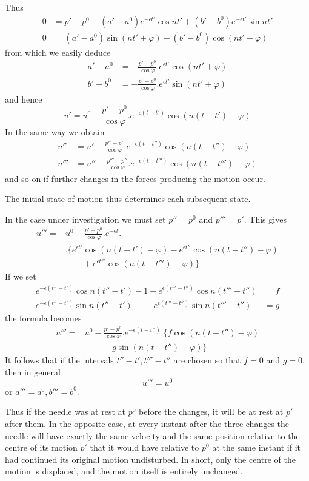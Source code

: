 Thus
\[
\begin{aligned}
0&=p'-p^0+(a'-a^0)e^{-\epsilon t'}\cos nt'+(b'-b^0)e^{-\epsilon t'}\sin nt'\\
0&=(a'-a^0)\sin(nt'+\varphi)-(b'-b^0)\cos(nt'+\varphi)
\end{aligned}
\]
from which we easily deduce
\[
\begin{aligned}
a'-a^0&=-\frac{p'-p^0}{\cos\varphi}.e^{\epsilon t'}\cos(nt'+\varphi)\\
b'-b^0&=-\frac{p'-p^0}{\cos\varphi}.e^{\epsilon t'}\sin(nt'+\varphi)
\end{aligned}
\]
and hence
\[
u'=u^0-\frac{p'-p^0}{\cos\varphi}.e^{-\epsilon(t-t')}\cos(n(t-t')-\varphi)
\]
In the same way we obtain
\[
\begin{aligned}
u''&=u'-\frac{p''-p'}{\cos\varphi}.e^{-\epsilon(t-t'')}\cos(n(t-t'')-\varphi)\\
u'''&=u''-\frac{p'''-p''}{\cos\varphi}.e^{-\epsilon(t-t''')}\cos(n(t-t''')-\varphi)
\end{aligned}
\]
and so on if further changes in the forces producing the motion occur.

The initial state of motion thus determines each subsequent state.

In the case under investigation we must set $p''=p^0$ and $p'''=p'$. This gives
\[
\begin{aligned}
u'''={}&u^0-\frac{p'-p^0}{\cos\varphi}.e^{-\epsilon t}.\\
&.\{e^{\epsilon t'}\cos(n(t-t')-\varphi)-e^{\epsilon t''}\cos(n(t-t'')-\varphi)\\
&\qquad+e^{\epsilon t'''}\cos(n(t-t''')-\varphi)\}
\end{aligned}
\]
If we set
\[
\begin{aligned}
e^{-\epsilon(t''-t')}\cos n(t''-t')-1+e^{\epsilon(t'''-t'')}\cos n(t'''-t'')&=f\\
e^{-\epsilon(t''-t')}\sin n(t''-t')\phantom{-1}{}-e^{\epsilon(t'''-t'')}\sin n(t'''-t'')&=g
\end{aligned}
\]
the formula becomes
\[
\begin{aligned}
u'''={}&u^0-\frac{p'-p^0}{\cos\varphi}.e^{-\epsilon(t-t'')}.\{f\cos(n(t-t'')-\varphi)\\
&\qquad-g\sin(n(t-t'')-\varphi)\}
\end{aligned}
\]
It follows that if the intervals $t''-t',t'''-t''$ are chosen so that $f=0$ and $g=0$, then in general
\[
u'''=u^0
\]
or $a'''=a^0,b'''=b^0$.

Thus if the needle was at rest at $p^0$ before the changes, it will be at rest at $p'$ after them. In the opposite case, at every instant after the three changes the needle will have exactly the same velocity and the same position relative to the centre of its motion $p'$ that it would have relative to $p^0$ at the same instant if it had continued its original motion undisturbed. In short, only the centre of the motion is displaced, and the motion itself is entirely unchanged.

